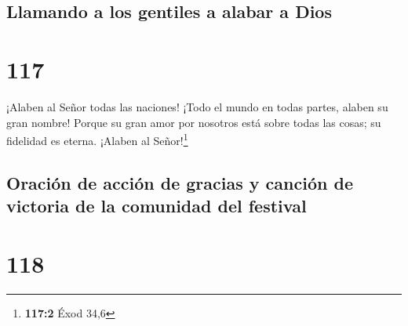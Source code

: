 \hypertarget{llamando-a-los-gentiles-a-alabar-a-dios}{%
\subsection{Llamando a los gentiles a alabar a
Dios}\label{llamando-a-los-gentiles-a-alabar-a-dios}}

\hypertarget{section-116}{%
\section{117}\label{section-116}}

 ¡Alaben al Señor todas las naciones! ¡Todo el mundo en
todas partes, alaben su gran nombre!  Porque su gran amor
por nosotros está sobre todas las cosas; su fidelidad es eterna. ¡Alaben
al Señor!\footnote{\textbf{117:2} Éxod 34,6}

\hypertarget{oraciuxf3n-de-acciuxf3n-de-gracias-y-canciuxf3n-de-victoria-de-la-comunidad-del-festival}{%
\subsection{Oración de acción de gracias y canción de victoria de la
comunidad del
festival}\label{oraciuxf3n-de-acciuxf3n-de-gracias-y-canciuxf3n-de-victoria-de-la-comunidad-del-festival}}

\hypertarget{section-117}{%
\section{118}\label{section-117}}

